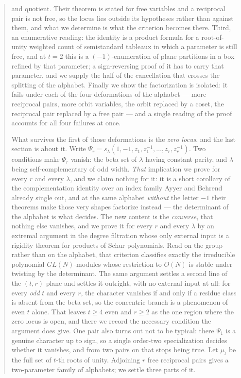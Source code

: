 \documentclass[11pt,reqno]{amsart}
\theoremstyle{plain}
\theoremstyle{definition}
\newcommand{\zt}{\mu_t}
\begin{document}
\begin{abstract}
and quotient. Their theorem is stated for free variables and a reciprocal pair is not free, so the
locus lies outside its hypotheses rather than against them, and what we determine is what the
criterion becomes there. Third, an
enumerative reading: the
identity is a product formula for a root-of-unity weighted count of semistandard tableaux in which a
parameter is still free, and at $t=2$ this is a $(-1)$-enumeration of plane partitions in a box
refined by that parameter; a sign-reversing proof of it has to carry that parameter, and we supply
the half of the cancellation that crosses the splitting of the alphabet. Finally we show the
factorization is isolated: it fails under each of the
four deformations of the alphabet --- more reciprocal pairs, more orbit variables, the orbit replaced
by a coset, the reciprocal pair replaced by a free pair --- and a single reading of the proof
accounts for all four failures at once.

What survives the first of those deformations is the \emph{zero locus}, and the last section is about
it. Write $\Psi_r=s_\lambda(1,-1,z_1,z_1^{-1},\dots,z_r,z_r^{-1})$. Two conditions make $\Psi_r$
vanish: the beta set of $\lambda$ having constant parity, and $\lambda$ being self-complementary of
odd width. \emph{That} implication we prove for every $r$ and every $\lambda$, and we claim nothing
for it: it is a short corollary of the complementation identity over an index family Ayyer and
Behrend already single out, and at the same alphabet \emph{without} the letter $-1$ their theorems
make those very shapes factorize instead --- the determinant of the alphabet is what decides.
The new content is the \emph{converse}, that nothing else vanishes, and we prove it for every $r$
and every $\lambda$ by an extremal argument in the degree filtration whose only external input is a
rigidity theorem for products of Schur polynomials. Read on the group rather than on the alphabet,
that criterion classifies exactly the irreducible polynomial $GL(N)$-modules whose restriction to
$O(N)$ is stable under twisting by the determinant. The same argument settles a second line of the
$(t,r)$ plane and settles it outright, with no external input at all: for every \emph{odd} $t$ and
every $r$, the character vanishes if and only if a residue class is absent from the beta set, so the
concentric branch is a phenomenon of even $t$ alone. That leaves $t\ge4$ even and $r\ge2$ as the one
region where the zero locus is open, and there we record the necessary condition the argument does
give. One pair also turns out not to be typical:
there $\Psi_1$ is a genuine character up to sign, so a single order-two specialization decides
whether it vanishes, and from two pairs on that stops being true.
\else
Let $\zt$ be the full set of $t$-th roots of unity. Adjoining $r$ free reciprocal pairs gives a
two-parameter family of alphabets; we settle three parts of it.


\end{abstract}
\end{document}
